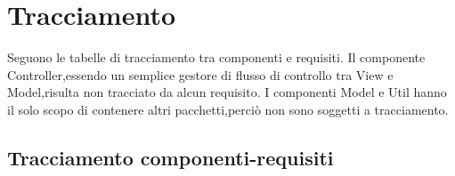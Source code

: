 \section{Tracciamento}
\label{tracciamento}
Seguono le tabelle di tracciamento tra componenti e requisiti.
Il componente Controller,essendo un semplice gestore di flusso di controllo tra View e Model,risulta non tracciato da alcun requisito.
I componenti Model e Util hanno il solo scopo di contenere altri pacchetti,perciò non sono soggetti a tracciamento.

\subsection{Tracciamento componenti-requisiti}
\label{componenti-requisiti}
    
\newdimen\larghezza
\setlength{\larghezza}{7cm}
\newdimen\dimTipo
\setlength{\dimTipo}{2cm}
\newdimen\dimFonti
\setlength{\dimFonti}{2cm}
	
